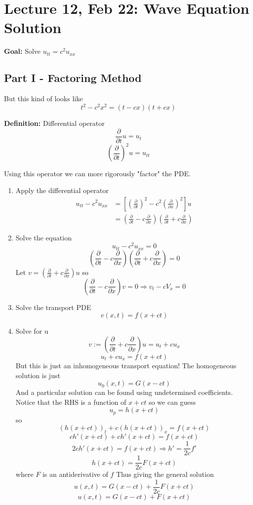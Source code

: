 \documentclass[12pt]{article}
\begin{document}
\section*{Lecture 12, Feb 22: Wave Equation Solution}
\textbf{Goal:} Solve $u_{tt} = c^2 u_{xx}$
\subsection*{Part I - Factoring Method}
But this kind of looks like 
\[t^2 - c^2 x^2 = (t - cx)(t + cx)\]

\textbf{Definition:} Differential operator
\[\frac{\partial}{\partial t} u = u_t\]
\[\left(\frac{\partial}{\partial t}\right)^2 u = u_{tt}\]

Using this operator we can more rigorously "factor" the PDE.

\begin{enumerate}
    \item Apply the differential operator 
    \begin{align*}
        u_{tt} - c^2 u_{xx} &= \left[\left(\frac{\partial}{\partial t}\right)^2 - c^2 \left(\frac{\partial}{\partial x}\right)^2\right]u\\
        &= \left(\frac{\partial}{\partial t} - c \frac{\partial}{\partial x}\right)\left(\frac{\partial}{\partial t} + c \frac{\partial}{\partial x}\right)
    \end{align*}
    \item Solve the equation 
    \[u_{tt} - c^2 u_{xx} = 0\]
    \[\left(\frac{\partial}{\partial t} - c \frac{\partial}{\partial x}\right)\left(\frac{\partial}{\partial t} + c \frac{\partial}{\partial x}\right) = 0\]
    Let $v = \left(\frac{\partial}{\partial t} + c \frac{\partial}{\partial x}\right)u$ 
    so 
    \[\left(\frac{\partial}{\partial t} - c \frac{\partial}{\partial x}\right)v = 0 \Longrightarrow v_t - cV_x = 0\]
    \item Solve the transport PDE 
    \[v(x, t) = f(x + ct)\]
    \item Solve for u 
    \[v := \left(\frac{\partial}{\partial t} + c \frac{\partial}{\partial x}\right)u = u_t + cu_x\]
    \[u_t + cu_x = f(x + ct)\]
    But this is just an inhomogeneous transport equation! 
    The homogeneous solution is just 
    \[u_0(x, t)= G(x - ct)\]
    And a particular solution can be found using undetermined coefficients. Notice that the RHS is a function of $x +ct$ so we can guess 
    \[u_p = h(x + ct)\]
    so 
    \[(h(x + ct))_t + c(h(x + ct))_x = f(x + ct)\]
    \[ch'(x+ ct) + ch'(x + ct) = f(x + ct)\]
    \[2ch'(x + ct) = f(x + ct) \Longrightarrow h' = \frac{1}{2c}f'\]
    \[h(x + ct) = \frac{1}{2c}F(x + ct)\]
    where $F$ is an antiderivative of $f$
    Thus giving the general solution
    \[u(x, t)= G(x - ct) + \frac{1}{2c}F(x + ct) \]
    \[\boxed{u(x, t) = G(x - ct) + F(x + ct)}\]
\end{enumerate}
\end{document}
